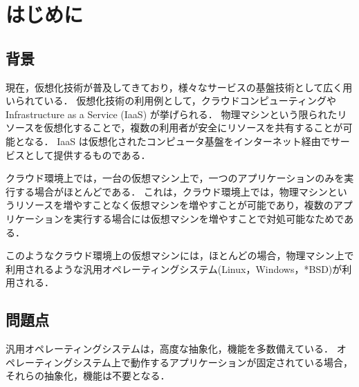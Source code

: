 \documentclass[graduation-thesis]{mlarticle}
\author{61200185 情報工学科 縣直道}
\date{\today}
\title{}
\begin{document}
\makeatletter
\renewcommand{\thetable}{
        \thesection.\arabic{table}
} %
  
\renewcommand{\thefigure}{
        \thesection.\arabic{figure}
}

\setcounter{page}{1}

\tableofcontents
\clearpage


 
\section{はじめに}
\label{intro}
\subsection {背景}
\label {intro:background}
現在，仮想化技術が普及してきており，様々なサービスの基盤技術として広く用いられている．
仮想化技術の利用例として，クラウドコンピューティングやInfrastructure as a Service (IaaS) が挙げられる．
物理マシンという限られたリソースを仮想化することで，複数の利用者が安全にリソースを共有することが可能となる．
IaaS は仮想化されたコンピュータ基盤をインターネット経由でサービスとして提供するものである．

クラウド環境上では，一台の仮想マシン上で，一つのアプリケーションのみを実行する場合がほとんどである．
これは，クラウド環境上では，物理マシンというリソースを増やすことなく仮想マシンを増やすことが可能であり，複数のアプリケーションを実行する場合には仮想マシンを増やすことで対処可能なためである．

このようなクラウド環境上の仮想マシンには，ほとんどの場合，物理マシン上で利用されるような汎用オペレーティングシステム(Linux，Windows，*BSD)が利用される．

\subsection {問題点}
\label {intro:problem}
汎用オペレーティングシステムは，高度な抽象化，機能を多数備えている．
オペレーティングシステム上で動作するアプリケーションが固定されている場合，それらの抽象化，機能は不要となる．
\end{document}
